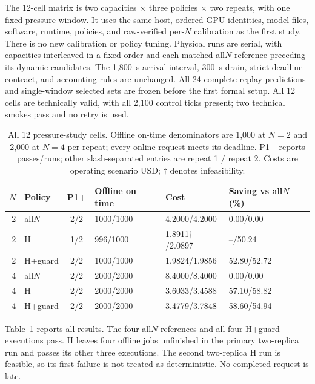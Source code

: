 The 12-cell matrix is two capacities $\times$ three policies $\times$ two
repeats, with one fixed pressure window. It uses the same host, ordered GPU
identities, model files, software, runtime, policies, and raw-verified per-$N$
calibration as the first study. There is no new calibration or policy tuning.
Physical runs are serial, with capacities interleaved in a fixed order and
each matched all$N$ reference preceding its dynamic candidates. The
1,800~s arrival interval, 300~s drain, strict deadline contract, and
accounting rules are unchanged. All 24 complete replay predictions and
single-window selected sets are frozen before the first formal setup.
All 12 cells are technically valid, with all 2,100 control ticks present;
two technical smokes pass and no retry is used.

\begin{table}[t]
\centering\small
\caption{All 12 pressure-study cells. Offline on-time denominators are
1,000 at $N=2$ and 2,000 at $N=4$ per repeat; every online request meets
its deadline. P1+ reports passes/runs; other slash-separated entries are
repeat 1 / repeat 2.
Costs are operating scenario USD; $\dagger$ denotes infeasibility.}
\label{tab:pressure-physical}
\setlength{\tabcolsep}{3pt}
\begin{tabular*}{\textwidth}{@{\extracolsep{\fill}}rlclll@{}}
\toprule
$N$ & Policy & P1+ & Offline on time & Cost & Saving vs all$N$ (\%)\\
\midrule
2 & all$N$ & 2/2 & 1000/1000 & 4.2000/4.2000 & 0.00/0.00 \\
2 & H & 1/2 & 996/1000 & 1.8911$\dagger$/2.0897 & --/50.24 \\
2 & H+guard & 2/2 & 1000/1000 & 1.9824/1.9856 & 52.80/52.72 \\
\midrule
4 & all$N$ & 2/2 & 2000/2000 & 8.4000/8.4000 & 0.00/0.00 \\
4 & H & 2/2 & 2000/2000 & 3.6033/3.4588 & 57.10/58.82 \\
4 & H+guard & 2/2 & 2000/2000 & 3.4779/3.7848 & 58.60/54.94 \\
\bottomrule
\end{tabular*}
\end{table}

Table~\ref{tab:pressure-physical} reports all results. The four all$N$
references and all four H+guard executions pass. H leaves four offline
jobs unfinished in the primary two-replica run and passes its other three
executions. The second two-replica H run is feasible, so its first failure
is not treated as deterministic. No completed request is late.

